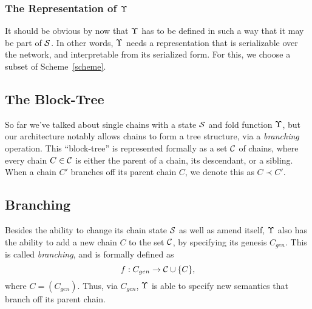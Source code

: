 \subsubsection{The Representation of $\Upsilon$}

It should be obvious by now that $\Upsilon$ has to be defined in such a way that
it may be part of $\mathcal{S}$. In other words, $\Upsilon$ needs a representation
that is serializable over the network, and interpretable from its serialized
form. For this, we choose a subset of Scheme~\ref{scheme}.

\subsection{The Block-Tree}

So far we've talked about single chains with a state $\mathcal{S}$ and fold function
$\Upsilon$, but our architecture notably allows chains to form a tree structure,
via a \emph{branching} operation. This ``block-tree'' is represented formally
as a set $\mathcal{C}$ of chains, where every chain $C \in \mathcal{C}$ is either the
parent of a chain, its descendant, or a sibling. When a chain $C'$ branches off
its parent chain $C$, we denote this as $C \prec C'$.

\subsection{Branching}

Besides the ability to change its chain state $\mathcal{S}$ as well as amend itself,
$\Upsilon$ also has the ability to add a new chain $C$ to the set $\mathcal{C}$, by
specifying its genesis $C_{gen}$. This is called \emph{branching}, and is
formally defined as
\[
    f : C_{gen} \to \mathcal{C} \cup \{C\},
\]
where $C = (C_{gen})$. Thus, via $C_{gen}$, $\Upsilon$ is able to specify new
semantics that branch off its parent chain.
